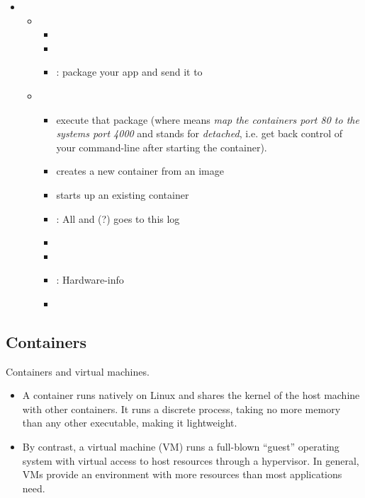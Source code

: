 \begin{itemize}
    \item {} \begin{itemize}
        \item {} \begin{itemize}
            \item {}
            \item {}
            \item {}: package your app and send it to 
        \end{itemize}
        \item {} \begin{itemize}
            \item {}execute that package (where  means \emph{map the containers port 80 to the systems port 4000} and  stands for \emph{detached}, i.e. get back control of your command-line after starting the container).
            \item {} creates a new container from an image
            \item {} starts up an existing container
            \item {}: All  and  (?) goes to this log
            \item {}
            \item {}
            \item {}: Hardware-info
            \item {}
        \end{itemize}
    \end{itemize}
\end{itemize}



\subsection{Containers}

Containers and virtual machines.
\begin{itemize}
    \item A container runs natively on Linux and shares the kernel of the host machine with other containers. It runs a discrete process, taking no more memory than any other executable, making it lightweight.
    \item By contrast, a virtual machine (VM) runs a full-blown “guest” operating system with virtual access to host resources through a hypervisor. In general, VMs provide an environment with more resources than most applications need.
\end{itemize}

